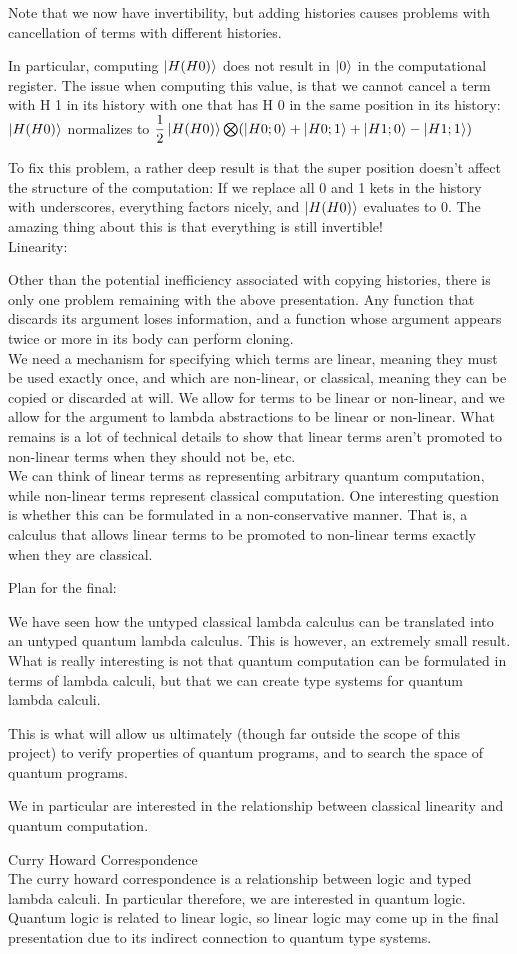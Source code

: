 \documentclass{article}
\theoremstyle{plain}
\theoremstyle{definition}
\theoremstyle{remark}
\begin{document}
Note that we now have invertibility, but adding histories causes problems with cancellation of terms with different histories.

In particular, computing  $\left|\mspace{0.5mu} H (H 0) \mspace{0.5mu}\right\rangle$ does not result in $\left|\mspace{0.5mu} 0 \mspace{0.5mu}\right\rangle$ in the computational register. The issue when computing this value, is that we cannot cancel a term with H 1 in its history with one that has H 0 in the same position in its history:
 $\left|\mspace{0.5mu} H (H 0) \mspace{0.5mu}\right\rangle$ normalizes to $\dfrac{1}{2} \left|\mspace{0.5mu} H (H 0) \mspace{0.5mu}\right\rangle \bigotimes (\left|\mspace{0.5mu} H 0; 0 \mspace{0.5mu}\right\rangle + \left|\mspace{0.5mu} H 0; 1 \mspace{0.5mu}\right\rangle + \left|\mspace{0.5mu} H 1; 0 \mspace{0.5mu}\right\rangle - \left|\mspace{0.5mu} H 1; 1 \mspace{0.5mu}\right\rangle)$

 To fix this problem, a rather deep result is that the super position doesn't affect the structure of the computation: If we replace all 0 and 1 kets in the history with underscores, everything factors nicely, and $\left|\mspace{0.5mu} H (H 0) \mspace{0.5mu}\right\rangle$ evaluates to 0. The amazing thing about this is that everything is still invertible!
$$$$
$$$$
{
\Large Linearity:}
$$$$
$$$$

Other than the potential inefficiency associated with copying histories, there is only one problem remaining with the above presentation.
Any function that discards its argument loses information, and a function whose argument appears twice or more in its body can perform cloning.
$$$$
We need a mechanism for specifying which terms are linear, meaning they must be used exactly once, and which are non-linear, or classical, meaning they can be copied or discarded at will. We allow for terms to be linear or non-linear, and we allow for the argument to lambda abstractions to be linear or non-linear. What remains is a lot of technical details to show that linear terms aren't promoted to non-linear terms when they should not be, etc.
$$$$
We can think of linear terms as representing arbitrary quantum computation, while non-linear terms represent classical computation.
One interesting question is whether this can be formulated in a non-conservative manner. That is, a calculus that allows linear terms to be promoted to non-linear terms exactly when they are classical. 
$$$$

$$$$
$$$$
{
\Large Plan for the final:}
$$$$
$$$$

We have seen how the untyped classical lambda calculus can be translated into an untyped quantum lambda calculus.
This is however, an extremely small result. What is really interesting is not that quantum computation can be formulated in terms of lambda calculi,
but that we can create type systems for quantum lambda calculi.

This is what will allow us ultimately (though far outside the scope of this project) to verify properties of quantum programs, and to search the space of quantum programs.

We in particular are interested in the relationship between classical linearity and quantum computation.

$$$$
Curry Howard Correspondence
$$$$
The curry howard correspondence is a relationship between logic and typed lambda calculi.
In particular therefore, we are interested in quantum logic.
Quantum logic is related to linear logic, so linear logic may come up in the final presentation due to its indirect connection to quantum type systems.
\end{document}
